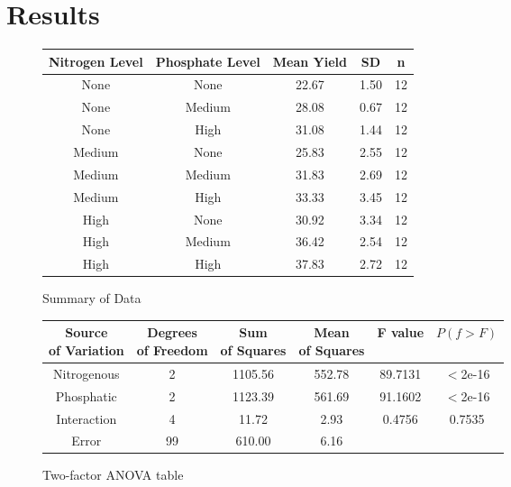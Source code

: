 \documentclass[12pt]{article}
\begin{document}
\section{Results}
\begin{figure}[ht]
    \centering
    \caption{Summary of Data}
    \begin{tabular}{c|c|c|c|c}
         \textbf{Nitrogen Level} & \textbf{Phosphate Level} & \textbf{Mean Yield} & \textbf{SD} & \textbf{n}\\ \hline
         None & None & 22.67 & 1.50 & 12\\
         None & Medium & 28.08 & 0.67 & 12\\
         None & High & 31.08 & 1.44 & 12\\
         Medium & None & 25.83 & 2.55 & 12\\
         Medium & Medium & 31.83 & 2.69 & 12\\
         Medium & High & 33.33 & 3.45 & 12\\
         High & None & 30.92 & 3.34 & 12\\
         High & Medium & 36.42 & 2.54 & 12\\
         High & High & 37.83 & 2.72 & 12
    \end{tabular}
\end{figure}
\vspace{3em}
\begin{figure}[ht]
    \centering
    \caption{Two-factor ANOVA table}
    \begin{tabular}{cccccc}
    \hline
    \makecell{Source\\ of Variation} & \makecell{Degrees\\ of Freedom} & \makecell{Sum\\ of Squares} &  \makecell{Mean\\ of Squares} & F value & \(P(f > F)\)\\ \hline
    Nitrogenous & 2 & 1105.56 & 552.78 & 89.7131 & \(<\)2e-16\\
    Phosphatic & 2 & 1123.39 & 561.69 & 91.1602 & \(<\)2e-16\\
    Interaction & 4 & 11.72 & 2.93 & 0.4756 & 0.7535\\
    Error & 99 & 610.00 & 6.16\\ \hline
    \end{tabular}
\end{figure}
\end{document}
